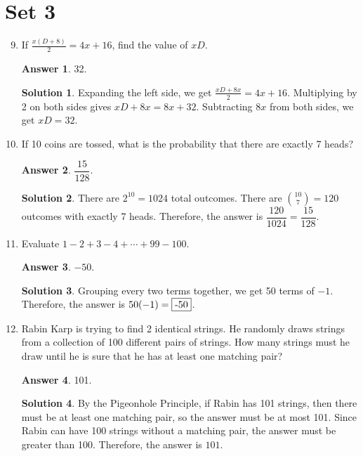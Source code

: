 \documentclass[11pt]{article}
\theoremstyle{definition}
\newtheorem*{solution}{Solution}
\newtheorem*{answer}{Answer}
\begin{document}
\section*{Set 3}
\begin{enumerate}
\setcounter{enumi}{8}

\item If $\frac{x(D+8)}{2} = 4x + 16$, find the value of $xD$.

\begin{answer}
32.
\end{answer}
\begin{solution} Expanding the left side, we get $\frac{xD + 8x}{2} = 4x + 16$. Multiplying by 2 on both sides gives $xD + 8x = 8x + 32$. Subtracting $8x$ from both sides, we get $xD = \boxed{32}$.

\end{solution}

\item If 10 coins are tossed, what is the probability that there are exactly 7 heads?

\begin{answer}
$\dfrac{15}{128}$.
\end{answer}
\begin{solution} There are $2^{10} = 1024$ total outcomes. There are $\displaystyle  \binom{10}{7} = 120$ outcomes with exactly 7 heads. Therefore, the answer is $\dfrac{120}{1024} = \boxed{\dfrac{15}{128}}$.

\end{solution}

\item Evaluate $1-2+3-4+\dotsb+99-100$.

\begin{answer}
$-50$.
\end{answer}
\begin{solution} Grouping every two terms together, we get 50 terms of $-1$. Therefore, the answer is $50(-1) = \boxed{$-50$}$.

\end{solution}

\item Rabin Karp is trying to find 2 identical strings. He randomly draws strings from a collection of 100 different pairs of strings. How many strings must he draw until he is sure that he has at least one matching pair?

\begin{answer}
101.
\end{answer}
\begin{solution} By the Pigeonhole Principle, if Rabin has 101 strings, then there must be at least one matching pair, so the answer must be at most 101. Since Rabin can have 100 strings without a matching pair, the answer must be greater than 100. Therefore, the answer is $\boxed{101}$.
\end{solution}

\end{enumerate}
\end{document}
